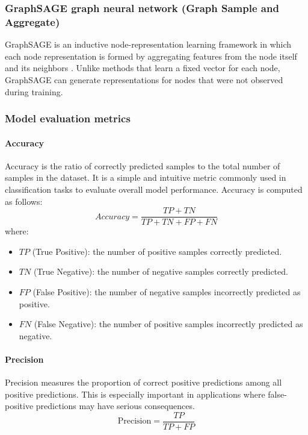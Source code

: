 \documentclass[10pt,twoside]{article}
\begin{document}
\subsubsection{GraphSAGE graph neural network (Graph Sample and Aggregate)}
GraphSAGE is an inductive node-representation learning framework in which each node representation is formed by aggregating features from the node itself and its neighbors \cite{hamilton_inductive_2018}. Unlike methods that learn a fixed vector for each node, GraphSAGE can generate representations for nodes that were not observed during training.
\subsubsection{Model evaluation metrics} 
\paragraph{Accuracy} 
Accuracy \cite{grandini_metrics_2020} is the ratio of correctly predicted samples to the total number of samples in the dataset. It is a simple and intuitive metric commonly used in classification tasks to evaluate overall model performance. Accuracy is computed as follows: 
\begin{equation} Accuracy = \frac{TP + TN}{TP + TN + FP + FN} 
\end{equation} where: 
\begin{itemize} 
\item $TP$ (True Positive): the number of positive samples correctly predicted. 
\item $TN$ (True Negative): the number of negative samples correctly predicted. 
\item $FP$ (False Positive): the number of negative samples incorrectly predicted as positive. 
\item $FN$ (False Negative): the number of positive samples incorrectly predicted as negative. 
\end{itemize}
\paragraph{Precision} 
Precision \cite{grandini_metrics_2020} measures the proportion of correct positive predictions among all positive predictions. This is especially important in applications where false-positive predictions may have serious consequences.
\begin{equation} 
\mathrm{Precision}=\frac{TP}{TP+FP}
\end{equation}
\end{document}
